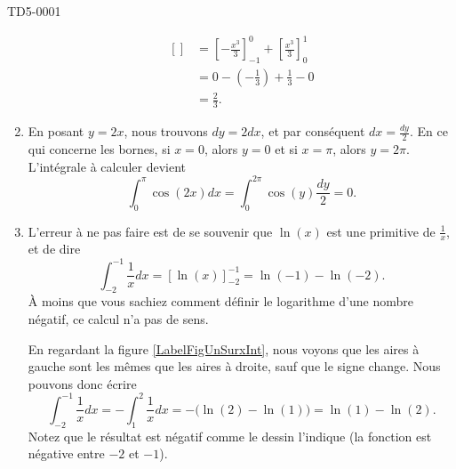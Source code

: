 \begin{corrige}{TD5-0001}
\begin{enumerate}
\begin{equation}
\begin{aligned}[]
					&=\left[ -\frac{ x^3 }{ 3 } \right]_{-1}^0+\left[ \frac{ x^3 }{ 3 } \right]_0^1\\
					&=0-\left( -\frac{ 1 }{ 3 } \right)+\frac{1}{ 3 }-0\\
					&=\frac{ 2 }{ 3 }.
				\end{aligned}
			\end{equation}
		\item
			En posant $y=2x$, nous trouvons $dy=2dx$, et par conséquent $dx=\frac{ dy }{2}$. En ce qui concerne les bornes, si $x=0$, alors $y=0$ et si $x=\pi$, alors $y=2\pi$. L'intégrale à calculer devient
			\begin{equation}
				\int_0^{\pi}\cos(2x)dx=\int_0^{2\pi}\cos(y)\frac{ dy }{ 2 }=0.
			\end{equation}
		\item


			L'erreur à ne pas faire est de se souvenir que $\ln(x)$ est une primitive de $\frac{1}{ x }$, et de dire
			\begin{equation}
				\int_{-2}^{-1}\frac{1}{ x }dx=\left[ \ln(x) \right]_{-2}^{-1}=\ln(-1)-\ln(-2).
			\end{equation}
            À moins que vous sachiez comment définir le logarithme d'une nombre négatif, ce calcul n'a pas de sens.

			En regardant la figure \ref{LabelFigUnSurxInt}, nous voyons que les aires à gauche sont les mêmes que les aires à droite, sauf que le signe change. Nous pouvons donc écrire
			\begin{equation}
				\int_{-2}^{-1}\frac{1}{ x }dx=-\int_1^2\frac{1}{ x }dx=-\Big( \ln(2)-\ln(1) \Big)=\ln(1)-\ln(2).
			\end{equation}
			Notez que le résultat est négatif comme le dessin l'indique (la fonction est négative entre $-2$ et $-1$).


\end{enumerate}
\end{corrige}

